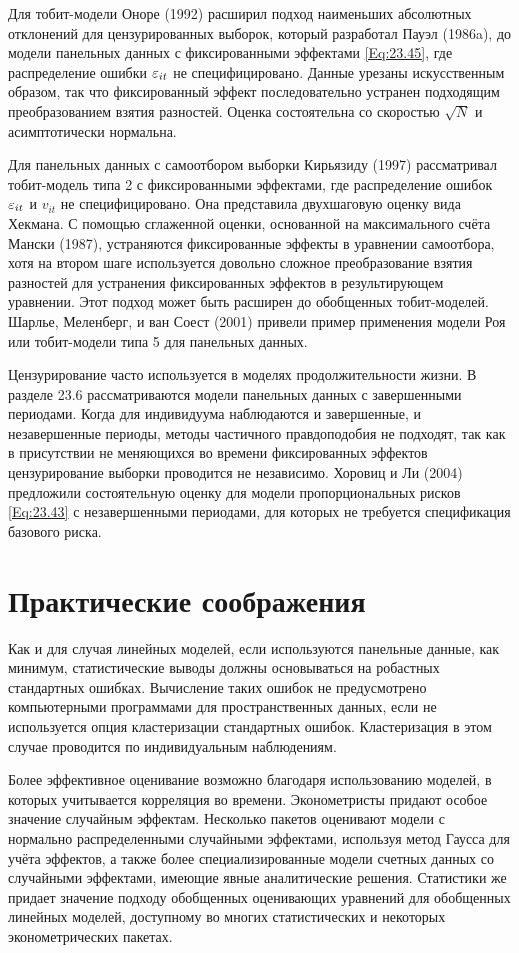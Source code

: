 Для тобит-модели Оноре (1992) расширил подход наименьших абсолютных отклонений для цензурированных выборок, который разработал Пауэл (1986a), до модели панельных данных с фиксированными эффектами \ref{Eq:23.45}, где распределение ошибки $\varepsilon_{it}$ не специфицировано. Данные урезаны искусственным образом, так что фиксированный эффект последовательно устранен подходящим преобразованием взятия разностей. Оценка состоятельна со скоростью $\sqrt{N}$ и асимптотически нормальна.

Для панельных данных с самоотбором выборки Кирьязиду (1997) рассматривал тобит-модель типа 2 с фиксированными эффектами, где распределение ошибок $\varepsilon_{it}$ и $v_{it}$  не специфицировано. Она представила двухшаговую оценку вида Хекмана. С помощью сглаженной оценки, основанной на максимального счёта Мански (1987), устраняются фиксированные эффекты в уравнении самоотбора, хотя на втором шаге используется довольно сложное преобразование взятия разностей для устранения фиксированных эффектов в результирующем уравнении. Этот подход может быть расширен до обобщенных тобит-моделей. Шарлье, Меленберг, и ван Соест (2001) привели пример применения модели Роя или тобит-модели типа 5 для панельных данных.

Цензурирование часто используется в моделях продолжительности жизни. В разделе 23.6 рассматриваются модели панельных данных с завершенными периодами. Когда для индивидуума наблюдаются и завершенные, и незавершенные периоды, методы частичного правдоподобия не подходят, так как в присутствии не меняющихся во времени фиксированных эффектов цензурирование выборки проводится не независимо. Хоровиц и Ли (2004) предложили состоятельную оценку для  модели пропорциональных рисков \ref{Eq:23.43} с незавершенными периодами, для которых не требуется спецификация базового риска.


\section{Практические соображения}
Как и для случая линейных моделей, если используются панельные данные, как минимум, статистические выводы должны основываться на робастных стандартных ошибках. Вычисление таких ошибок не предусмотрено компьютерными программами для пространственных данных, если не используется опция  кластеризации стандартных ошибок. Кластеризация в этом случае проводится по индивидуальным наблюдениям.

Более эффективное оценивание возможно благодаря использованию моделей, в которых учитывается корреляция во времени. Эконометристы придают особое значение случайным эффектам. Несколько пакетов оценивают модели с нормально распределенными случайными эффектами, используя метод Гаусса для учёта эффектов, а также более специализированные  модели счетных данных со случайными эффектами, имеющие явные аналитические решения. Статистики же придает значение подходу обобщенных оценивающих уравнений для обобщенных линейных моделей, доступному во многих статистических и некоторых эконометрических пакетах.

